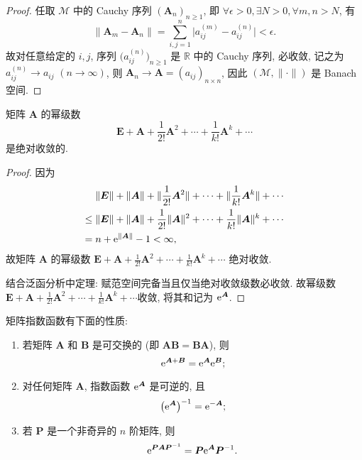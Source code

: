 \begin{proof}
  任取 $\mathcal{M}$ 中的 Cauchy 序列 $(\bm{A}_n)_{n\geq 1}$,
  即 $\forall\epsilon>0,\exists N>0,\forall m,n>N$, 有
  \[\|\bm{A}_m-\bm{A}_n\| = \sum_{i,j=1}^n \bigl|a_{ij}^{(m)} - a_{ij}^{(n)}\bigr|<\epsilon.\]
  故对任意给定的 $i,j$, 序列 $\bigl(a_{ij}^{(n)}\bigr)_{n\geq 1}$
  是 $\mathbb{R}$ 中的 Cauchy 序列, 必收敛, 记之为 $a_{ij}^{(n)}\to a_{ij}$ $(n\to\infty)$,
  则 $\bm{A}_n\to \bm{A}=(a_{ij})_{n\times n}$, 因此 $(\mathcal{M},\|\cdot\|)$ 是 Banach 空间.
\end{proof}



\begin{proposition}[教材 Page 171]
  矩阵 $\bm{A}$ 的幂级数
  \[\bm{E} + \bm{A} + \frac{1}{2!}\bm{A}^2 + \cdots +
    \frac{1}{k!}\bm{A}^k + \cdots\]
  是绝对收敛的.
\end{proposition}

\begin{proof}
  因为
  \begin{align*}
  & \|\bm{E}\|+\|\bm{A}\|+\|\frac{1}{2!}\bm{A}^2\|+\cdots+\|\frac{1}{k!}\bm{A}^k\|+\cdots\\
  \leq{} & \|\bm{E}\|+\|\bm{A}\|+\frac{1}{2!}\|\bm{A}\|^2+\cdots+\frac{1}{k!}\|\bm{A}\|^k+\cdots\\
  ={} & n+\mathrm{e}^{\|\bm{A}\|}-1<\infty,
  \end{align*}
  故矩阵 $\bm{A}$ 的幂级数 
  $\bm{E}+\bm{A}+\frac{1}{2!}\bm{A}^2+\cdots+\frac{1}{k!}\bm{A}^k+\cdots$ 绝对收敛.

  结合泛函分析中定理: 赋范空间完备当且仅当绝对收敛级数必收敛. 
  故幂级数 $\bm{E}+\bm{A}+\frac{1}{2!}\bm{A}^2+\cdots+\frac{1}{k!}\bm{A}^k+\cdots$收敛,
  将其和记为 $\mathrm{e}^{\bm{A}}$.
\end{proof}



\begin{proposition}
  矩阵指数函数有下面的性质:
  \begin{enumerate}[1)]
    \item 若矩阵 $\bm{A}$ 和 $\bm{B}$ 是可交换的 (即 $\bm{AB}=\bm{BA}$), 则
      \[\mathrm{e}^{\bm{A}+\bm{B}} = \mathrm{e}^{\bm{A}}\mathrm{e}^{\bm{B}};\]
    \item 对任何矩阵 $\bm{A}$, 指数函数 $\mathrm{e}^{\bm{A}}$ 是可逆的, 且
      \[\bigl(\mathrm{e}^{\bm{A}}\bigr)^{-1} = \mathrm{e}^{-\bm{A}};\]
    \item 若 $\bm{P}$ 是一个非奇异的 $n$ 阶矩阵, 则
      \[\mathrm{e}^{\bm{P}\bm{A}\bm{P}^{-1}} = \bm{P}\mathrm{e}^{\bm{A}}\bm{P}^{-1}.\]
  \end{enumerate}
\end{proposition}

